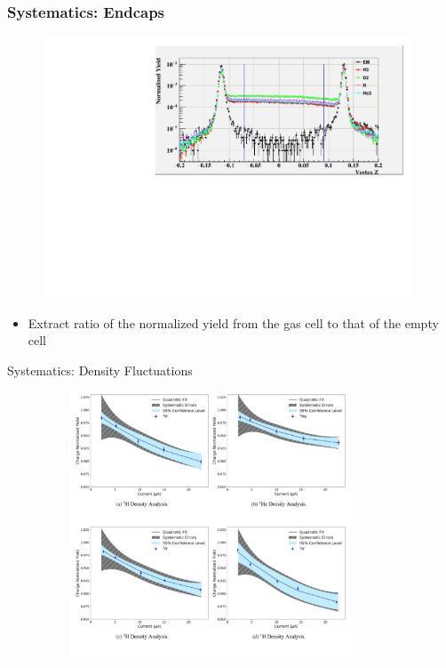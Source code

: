 \documentclass{beamer}
\begin{document}
\begin{frame}
\frametitle{Systematics: Endcaps}
	\vspace{-15pt}
\begin{block}{}
	\begin{figure}
		\includegraphics[width=11.0cm]{../images/endcap_kin4.pdf}
	\end{figure}

\begin{itemize}
	\item Extract ratio of the normalized yield from the gas cell to that of the empty cell
\end{itemize}

\end{block}
\end{frame}

\begin{frame}{Systematics: Density Fluctuations}
	\vspace{-25pt}
	\begin{figure}
		\includegraphics[width=10cm,height=8.0cm]{../images/density_cor.pdf}
		\vspace{-0.5cm}
		\caption*{\cite{denscor}}
	\end{figure}

\end{frame}
\end{document}
